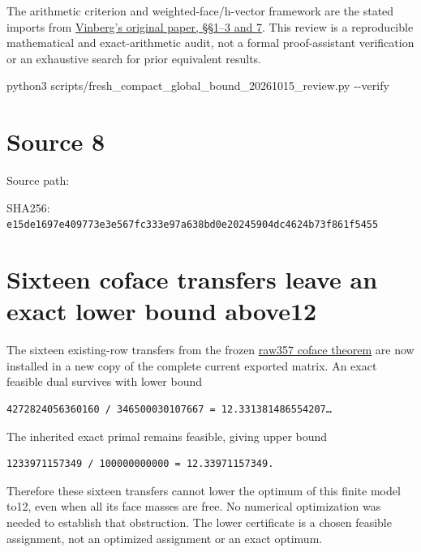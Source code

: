 \documentclass[
  10pt,
]{report}
\newenvironment{Shaded}{}{}
\newcommand{\AttributeTok}[1]{\textcolor[rgb]{0.49,0.56,0.16}{#1}}
\newcommand{\ExtensionTok}[1]{#1}
\newcommand{\NormalTok}[1]{#1}
\begin{document}
The arithmetic criterion and weighted-face/h-vector framework are the
stated imports from
\href{https://www.mathnet.ru/php/getFT.phtml?jrnid=mmo&option_lang=rus&paperid=444&what=fullt}{Vinberg's
original paper, §§1--3 and 7}. This review is a reproducible
mathematical and exact-arithmetic audit, not a formal proof-assistant
verification or an exhaustive search for prior equivalent results.

\begin{Shaded}
\begin{Highlighting}[]
\ExtensionTok{python3}\NormalTok{ scripts/fresh\_compact\_global\_bound\_20261015\_review.py }\AttributeTok{{-}{-}verify}
\end{Highlighting}
\end{Shaded}

\clearpage

\chapter{Source 8}\label{source-8}

Source path: 

SHA256:
\nolinkurl{e15de1697e409773e3e567fc333e97a638bd0e20245904dc4624b73f861f5455}

\chapter{Sixteen coface transfers leave an exact lower bound
above12}\label{sixteen-coface-transfers-leave-an-exact-lower-bound-above12}

The sixteen existing-row transfers from the frozen
\href{fresh_raw357_simplex_coface_transfer_20261018.md}{raw357 coface
theorem} are now installed in a new copy of the complete current
exported matrix. An exact feasible dual survives with lower bound

\begin{verbatim}
4272824056360160 / 346500030107667 = 12.331381486554207…
\end{verbatim}

The inherited exact primal remains feasible, giving upper bound

\begin{verbatim}
1233971157349 / 100000000000 = 12.33971157349.
\end{verbatim}

Therefore these sixteen transfers cannot lower the optimum of this
finite model to12, even when all its face masses are free. No numerical
optimization was needed to establish that obstruction. The lower
certificate is a chosen feasible assignment, not an optimized assignment
or an exact optimum.
\end{document}
